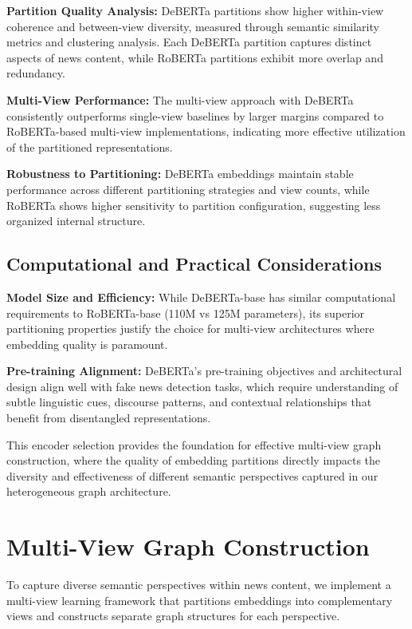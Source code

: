 \textbf{Partition Quality Analysis:} DeBERTa partitions show higher within-view coherence and between-view diversity, measured through semantic similarity metrics and clustering analysis. Each DeBERTa partition captures distinct aspects of news content, while RoBERTa partitions exhibit more overlap and redundancy.

\textbf{Multi-View Performance:} The multi-view approach with DeBERTa consistently outperforms single-view baselines by larger margins compared to RoBERTa-based multi-view implementations, indicating more effective utilization of the partitioned representations.

\textbf{Robustness to Partitioning:} DeBERTa embeddings maintain stable performance across different partitioning strategies and view counts, while RoBERTa shows higher sensitivity to partition configuration, suggesting less organized internal structure.

\subsection{Computational and Practical Considerations}

\textbf{Model Size and Efficiency:} While DeBERTa-base has similar computational requirements to RoBERTa-base (110M vs 125M parameters), its superior partitioning properties justify the choice for multi-view architectures where embedding quality is paramount.

\textbf{Pre-training Alignment:} DeBERTa's pre-training objectives and architectural design align well with fake news detection tasks, which require understanding of subtle linguistic cues, discourse patterns, and contextual relationships that benefit from disentangled representations.

This encoder selection provides the foundation for effective multi-view graph construction, where the quality of embedding partitions directly impacts the diversity and effectiveness of different semantic perspectives captured in our heterogeneous graph architecture.

\section{Multi-View Graph Construction}

To capture diverse semantic perspectives within news content, we implement a multi-view learning framework that partitions embeddings into complementary views and constructs separate graph structures for each perspective.


